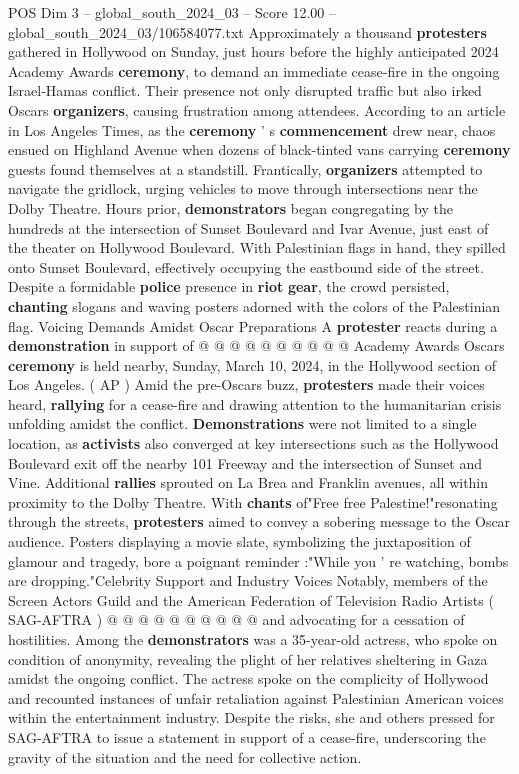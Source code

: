 \begin{textsample}{POS Dim 3 – global\_south\_2024\_03 – Score 12.00 – global\_south\_2024\_03/106584077.txt}  \label{ex:f3_pos_408}
Approximately a thousand \textbf{protesters} gathered in Hollywood on Sunday, just hours before the highly anticipated 2024 Academy Awards \textbf{ceremony}, to demand an immediate cease-fire in the ongoing Israel-Hamas conflict.
Their presence not only disrupted traffic but also irked Oscars \textbf{organizers}, causing frustration among attendees.
According to an article in Los Angeles Times, as the \textbf{ceremony} ' s \textbf{commencement} drew near, chaos ensued on Highland Avenue when dozens of black-tinted vans carrying \textbf{ceremony} guests found themselves at a standstill.
Frantically, \textbf{organizers} attempted to navigate the gridlock, urging vehicles to move through intersections near the Dolby Theatre.
Hours prior, \textbf{demonstrators} began congregating by the hundreds at the intersection of Sunset Boulevard and Ivar Avenue, just east of the theater on Hollywood Boulevard.
With Palestinian flags in hand, they spilled onto Sunset Boulevard, effectively occupying the eastbound side of the street.
Despite a formidable \textbf{police} presence in \textbf{riot} \textbf{gear}, the crowd persisted, \textbf{chanting} slogans and waving posters adorned with the colors of the Palestinian flag.
Voicing Demands Amidst Oscar Preparations A \textbf{protester} reacts during a \textbf{demonstration} in support of @ @ @ @ @ @ @ @ @ @ Academy Awards Oscars \textbf{ceremony} is held nearby, Sunday, March 10, 2024, in the Hollywood section of Los Angeles. ( AP ) Amid the pre-Oscars buzz, \textbf{protesters} made their voices heard, \textbf{rallying} for a cease-fire and drawing attention to the humanitarian crisis unfolding amidst the conflict. \textbf{Demonstrations} were not limited to a single location, as \textbf{activists} also converged at key intersections such as the Hollywood Boulevard exit off the nearby 101 Freeway and the intersection of Sunset and Vine.
Additional \textbf{rallies} sprouted on La Brea and Franklin avenues, all within proximity to the Dolby Theatre.
With \textbf{chants} of"Free free Palestine!"resonating through the streets, \textbf{protesters} aimed to convey a sobering message to the Oscar audience.
Posters displaying a movie slate, symbolizing the juxtaposition of glamour and tragedy, bore a poignant reminder :"While you ' re watching, bombs are dropping."Celebrity Support and Industry Voices Notably, members of the Screen Actors Guild and the American Federation of Television Radio Artists ( SAG-AFTRA ) @ @ @ @ @ @ @ @ @ @ and advocating for a cessation of hostilities.
Among the \textbf{demonstrators} was a 35-year-old actress, who spoke on condition of anonymity, revealing the plight of her relatives sheltering in Gaza amidst the ongoing conflict.
The actress spoke on the complicity of Hollywood and recounted instances of unfair retaliation against Palestinian American voices within the entertainment industry.
Despite the risks, she and others pressed for SAG-AFTRA to issue a statement in support of a cease-fire, underscoring the gravity of the situation and the need for collective action.

\end{textsample}

